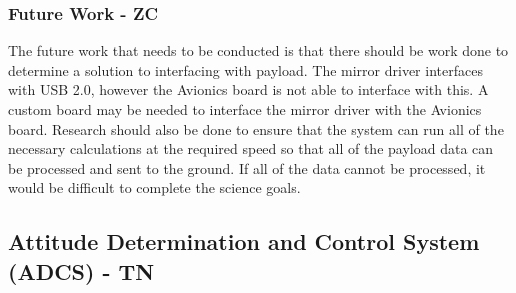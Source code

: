 \documentclass[12pt]{article}
\begin{document}
			\subsubsection{Future Work - ZC}
The future work that needs to be conducted is that there should be work done to determine a solution to interfacing with payload. The mirror driver interfaces with USB 2.0, however the Avionics board is not able to interface with this. A custom board may be needed to interface the mirror driver with the Avionics board. Research should also be done to ensure that the system can run all of the necessary calculations at the required speed so that all of the payload data can be processed and sent to the ground. If all of the data cannot be processed, it would be difficult to complete the science goals.


\newpage
\FloatBarrier

\subsection{Attitude Determination and Control System (ADCS) - TN} 
\end{document}
